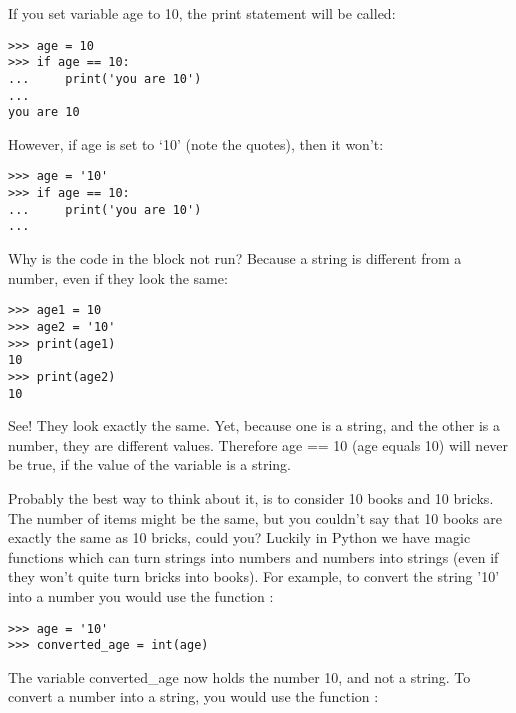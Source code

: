 If you set variable age to 10, the print statement will be called:

\begin{listing}
\begin{verbatim}
>>> age = 10
>>> if age == 10:
...     print('you are 10')
...
you are 10
\end{verbatim}
\end{listing}

However, if age is set to `10' (note the quotes), then it won't:

\begin{listing}
\begin{verbatim}
>>> age = '10'
>>> if age == 10:
...     print('you are 10')
...
\end{verbatim}
\end{listing}

Why is the code in the block not run?  Because a string is different from a number, even if they look the same:

\begin{listing}
\begin{verbatim}
>>> age1 = 10
>>> age2 = '10'
>>> print(age1)
10
>>> print(age2)
10
\end{verbatim}
\end{listing}

See!  They look exactly the same.  Yet, because one is a string, and the other is a number, they are different values. Therefore age == 10 (age equals 10) will never be true, if the value of the variable is a string.
\par
Probably the best way to think about it, is to consider 10 books and 10 bricks.  The number of items might be the same, but you couldn't say that 10 books are exactly the same as 10 bricks, could you? Luckily in Python we have magic functions which can turn strings into numbers and numbers into strings (even if they won't quite turn bricks into books). For example, to convert the string '10' into a number you would use the function :

\begin{listing}
\begin{verbatim}
>>> age = '10'
>>> converted_age = int(age)
\end{verbatim}
\end{listing}

\noindent
The variable converted\_age now holds the number 10, and not a string. To convert a number into a string, you would use the function :

